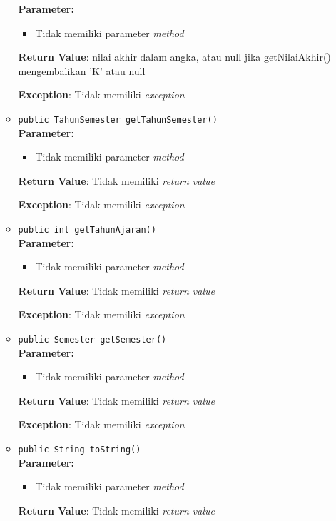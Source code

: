 \documentclass{article}
\begin{document}
\begin{enumerate}
\begin{itemize}
\textbf{Parameter:}\begin{itemize}
\item Tidak memiliki parameter \textit{method}
\end{itemize}
\textbf{Return Value}: nilai akhir dalam angka, atau null jika getNilaiAkhir() mengembalikan 'K' atau null

\textbf{Exception}: Tidak memiliki \textit{exception}

\item \texttt{public TahunSemester getTahunSemester()}\\ 


\textbf{Parameter:}\begin{itemize}
\item Tidak memiliki parameter \textit{method}
\end{itemize}
\textbf{Return Value}: Tidak memiliki \textit{return value}

\textbf{Exception}: Tidak memiliki \textit{exception}

\item \texttt{public int getTahunAjaran()}\\ 


\textbf{Parameter:}\begin{itemize}
\item Tidak memiliki parameter \textit{method}
\end{itemize}
\textbf{Return Value}: Tidak memiliki \textit{return value}

\textbf{Exception}: Tidak memiliki \textit{exception}

\item \texttt{public Semester getSemester()}\\ 


\textbf{Parameter:}\begin{itemize}
\item Tidak memiliki parameter \textit{method}
\end{itemize}
\textbf{Return Value}: Tidak memiliki \textit{return value}

\textbf{Exception}: Tidak memiliki \textit{exception}

\item \texttt{public String toString()}\\ 


\textbf{Parameter:}\begin{itemize}
\item Tidak memiliki parameter \textit{method}
\end{itemize}
\textbf{Return Value}: Tidak memiliki \textit{return value}


\end{itemize}
\end{enumerate}
\end{document}
